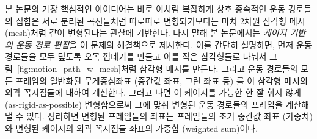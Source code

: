 \documentclass[12pt,a4paper,oneside,final]{report}
\begin{document}
본 논문의 가장 핵심적인 아이디어는 바로 이처럼 복잡하게 상호 종속적인 운동
경로들의 집합은 서로 분리된 곡선들처럼 따로따로 변형되기보다는 마치 2차원
삼각형 메시 (mesh)처럼 같이 변형된다는 관찰에 기반한다. 다시 말해 본 논문에서는
\emph{케이지 기반의 운동 경로 편집}을 이 문제의 해결책으로 제시한다. 이를
간단히 설명하면, 먼저 운동 경로들을 모두 덮도록 오목 껍데기를 만들고 이를 작은
삼각형들로 나눠서 그림~\ref{fig:motion_path_w_mesh}처럼 삼각형 메시를 만든다.
그리고 운동 경로들의 모든 프레임의 일반화된 무게중심좌표 (중간값 좌표, 그린
좌표 등) 를 이 삼각형 메시의 외곽 꼭지점들에 대하여 계산한다. 그러고 나면 이
케이지를 가능한 한 잘 휘지 않게 (as-rigid-as-possible) 변형함으로써 그에 맞춰
변형된 운동 경로들의 프레임을 계산해낼 수 있다. 정리하면 변형된 프레임들의 좌표는
프레임들의 초기 중간값 좌표 (가중치)와 변형된 케이지의 외곽 꼭지점들 좌표의
가중합 (weighted sum)이다.


%

%
%
\end{document}
